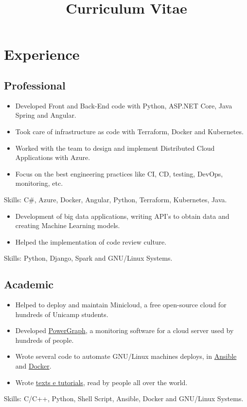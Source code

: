 \documentclass[10pt, a4paper, roman]{moderncv} %
\title{Curriculum Vitae}
\begin{document}
\makecvtitle %

\section{Experience}
\subsection{Professional}

{
}


{
    \begin{itemize}
        \item Developed Front and Back-End code with Python, ASP.NET Core, Java Spring and Angular.
	    \item Took care of infrastructure as code with Terraform, Docker and Kubernetes.
	    \item Worked with the team to design and implement Distributed Cloud Applications with Azure.
	    \item Focus on the best engineering practices like CI, CD, testing, DevOps, monitoring, etc.
    \end{itemize}
Skills: C\#, Azure, Docker, Angular, Python, Terraform, Kubernetes, Java.
}

{
    \begin{itemize}
        \item Development of big data applications, writing API's to obtain data and creating Machine Learning models. 
        \item Helped the implementation of code review culture.
    \end{itemize}
    Skills: Python, Django, Spark and GNU/Linux Systems.
}

\subsection{Academic}
{
    \begin{itemize}
        \item Helped to deploy and maintain Minicloud, a free open-source cloud for hundreds of Unicamp students.
        \item Developed \href{https://github.com/Guilhermeslucas/powergraph}{PowerGraph}, a monitoring software for a cloud server used by hundreds of people.
        \item Wrote several code to automate GNU/Linux machines deploys, in \href{https://github.com/Guilhermeslucas/Ansible-Code}{Ansible} and 
            \href{https://github.com/Guilhermeslucas/Dockerfiles}{Docker}.
        \item Wrote \href{http://openpower.ic.unicamp.br/blog/}{texts e tutorials}, read by people all over the world. 
    \end{itemize}
    Skills: C/C++, Python, Shell Script, Ansible, Docker and GNU/Linux Systems.
}
\end{document}
